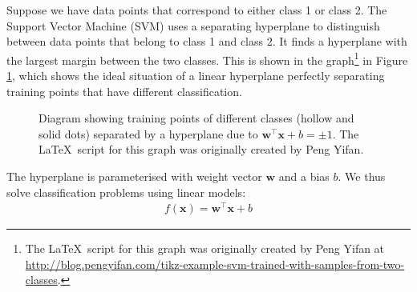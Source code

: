 \documentclass[12pt, twoside, a4paper]{report}
\def\vec{\boldsymbol}
\begin{document}
Suppose we have data points that correspond to either class 1 or class 2. The Support Vector Machine (SVM) \cite{RefWorks:122} uses a separating hyperplane to distinguish between data points that belong to class 1 and class 2. It finds a hyperplane with the largest margin between the two classes. This is shown in the graph\footnote{The \LaTeX $\,$ script for this graph was originally created by Peng Yifan at \url{http://blog.pengyifan.com/tikz-example-svm-trained-with-samples-from-two-classes}.} in Figure \ref{bg:svm:diag}, which shows the ideal situation of a linear hyperplane perfectly separating training points that have different classification.

\begin{figure}
\centering
{}
\caption{Diagram showing training points of different classes (hollow and solid dots) separated by a hyperplane due to $\vec{w}^\top \vec{x} + b = \pm 1$. The \LaTeX $\,$ script for this graph was originally created by Peng Yifan.}
\label{bg:svm:diag}
\end{figure}

The hyperplane is parameterised with weight vector $\boldsymbol w$ and a bias $b$. We thus solve classification problems using linear models:
\begin{align}
f(\vec{x}) = \vec{w}^\top \vec{x} + b \label{bg:svm:linear_model}
\end{align}
\end{document}
